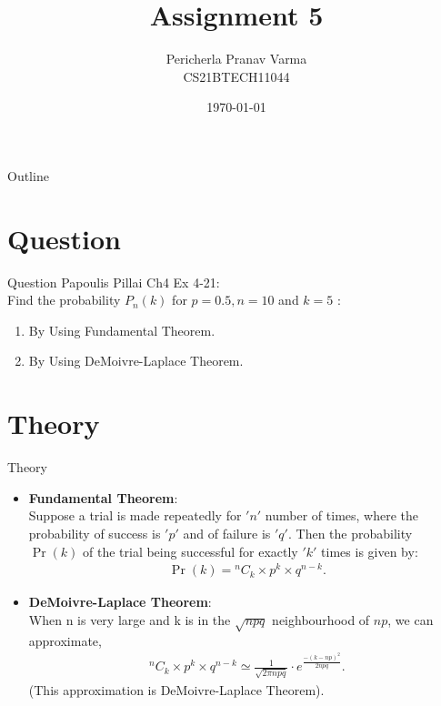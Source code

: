 \documentclass{beamer}
\title{Assignment 5}
\author{Pericherla Pranav Varma\\CS21BTECH11044}
\date{\today}
\providecommand{\pr}[1]{\ensuremath{\Pr\left(#1\right)}}
\newcommand*{\Comb}[2]{{}^{#1}C_{#2}}
\begin{document}
    \begin{frame}
        \titlepage 
    \end{frame}

    \begin{frame}{Outline}
        \tableofcontents
    \end{frame}

    \section{Question}
    	\begin{frame}{Question}
    	Papoulis Pillai Ch4 Ex 4-21:\\[9pt]
    Find the probability	$P_n(k)$ for $p=0.5,n=10$ and $k=5$ :\\[6pt]
    
 
    \begin{enumerate}[label=(\alph{enumi})]
    		\item By Using Fundamental Theorem.
    		\item By Using DeMoivre-Laplace Theorem.
    \end{enumerate} 
    	\end{frame}
    	
    	\section{Theory}
    	\begin{frame}{Theory}
    	\begin{itemize}
    	\item \textbf{Fundamental Theorem}:\\
    	Suppose a trial is made repeatedly for $'n'$ number of times, where the probability of success is $'p'$ and of failure is $'q'$. Then the probability $\pr{k}$ of the trial being successful for exactly $'k'$ times is given by:
    	\begin{align*}
    	\pr{k} = \Comb{n}{k} \times p^k \times q^{n-k}.
    	\end{align*}
    	\item \textbf{DeMoivre-Laplace Theorem}:\\
    	When n is very large and k is in the $\sqrt{npq}$ neighbourhood of $np$, we can approximate,
	\begin{align*}
	\Comb{n}{k} \times p^k \times q^{n-k} \simeq \frac{1}{\sqrt{2\pi npq}} \cdot e^{\frac{-(k-np)^2}{2npq}}.
	\end{align*}	    	
    	(This approximation is DeMoivre-Laplace Theorem).
    	\end{itemize}
    	\end{frame}
    	
\end{document}
